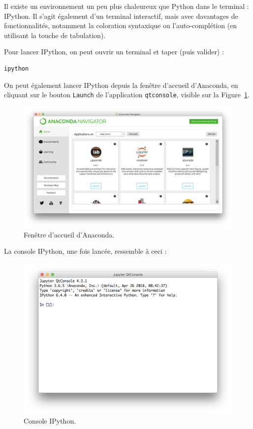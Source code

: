 \documentclass[12pt,]{book}
\numberwithin{equation}{section}
\numberwithin{countremarque}{section}
\begin{document}
Il existe un environnement un peu plus chaleureux que Python dans le
terminal : IPython. Il s'agit également d'un terminal interactif, mais
avec davantages de fonctionnalités, notamment la coloration syntaxique
ou l'auto-complétion (en utilisant la touche de tabulation).

Pour lancer IPython, on peut ouvrir un terminal et taper (puis valider)
:

\begin{lstlisting}
ipython
\end{lstlisting}

On peut également lancer IPython depuis la fenêtre d'accueil d'Anaconda,
en cliquant sur le bouton \texttt{Launch} de l'application
\texttt{qtconsole}, visible sur la
Figure~\ref{fig:intro-anaconda-navigator}.

\begin{figure}[H]

{\centering \includegraphics[width=1\linewidth]{figs/anaconda_navigator} 

}

\caption{Fenêtre d'accueil d'Anaconda.}\label{fig:intro-anaconda-navigator}
\end{figure}

La console IPython, une fois lancée, ressemble à ceci :

\begin{figure}[H]

{\centering \includegraphics[width=0.7\linewidth]{figs/ipython} 

}

\caption{Console IPython.}\label{fig:unnamed-chunk-4}
\end{figure}
\end{document}
